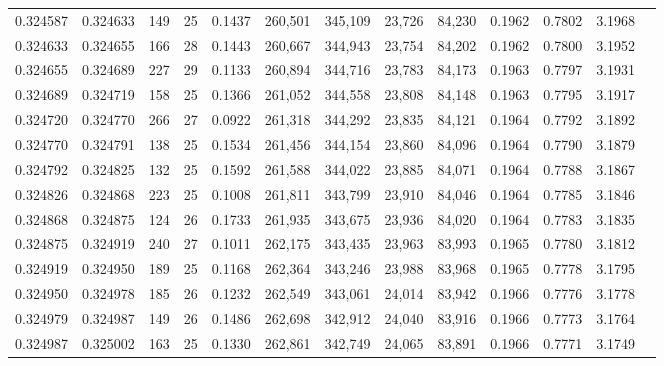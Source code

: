 \begin{tabular}{rrrrrrrrrrrrr}
0.324587 & 0.324633 &   149 &  25 &                                     0.1437 & 260,501 & 345,109 &  23,726 &  84,230 & 0.1962 & 0.7802 & 3.1968 \\
0.324633 & 0.324655 &   166 &  28 &                                     0.1443 & 260,667 & 344,943 &  23,754 &  84,202 & 0.1962 & 0.7800 & 3.1952 \\
0.324655 & 0.324689 &   227 &  29 &                                     0.1133 & 260,894 & 344,716 &  23,783 &  84,173 & 0.1963 & 0.7797 & 3.1931 \\
0.324689 & 0.324719 &   158 &  25 &                                     0.1366 & 261,052 & 344,558 &  23,808 &  84,148 & 0.1963 & 0.7795 & 3.1917 \\
0.324720 & 0.324770 &   266 &  27 &                                     0.0922 & 261,318 & 344,292 &  23,835 &  84,121 & 0.1964 & 0.7792 & 3.1892 \\
0.324770 & 0.324791 &   138 &  25 &                                     0.1534 & 261,456 & 344,154 &  23,860 &  84,096 & 0.1964 & 0.7790 & 3.1879 \\
0.324792 & 0.324825 &   132 &  25 &                                     0.1592 & 261,588 & 344,022 &  23,885 &  84,071 & 0.1964 & 0.7788 & 3.1867 \\
0.324826 & 0.324868 &   223 &  25 &                                     0.1008 & 261,811 & 343,799 &  23,910 &  84,046 & 0.1964 & 0.7785 & 3.1846 \\
0.324868 & 0.324875 &   124 &  26 &                                     0.1733 & 261,935 & 343,675 &  23,936 &  84,020 & 0.1964 & 0.7783 & 3.1835 \\
0.324875 & 0.324919 &   240 &  27 &                                     0.1011 & 262,175 & 343,435 &  23,963 &  83,993 & 0.1965 & 0.7780 & 3.1812 \\
0.324919 & 0.324950 &   189 &  25 &                                     0.1168 & 262,364 & 343,246 &  23,988 &  83,968 & 0.1965 & 0.7778 & 3.1795 \\
0.324950 & 0.324978 &   185 &  26 &                                     0.1232 & 262,549 & 343,061 &  24,014 &  83,942 & 0.1966 & 0.7776 & 3.1778 \\
0.324979 & 0.324987 &   149 &  26 &                                     0.1486 & 262,698 & 342,912 &  24,040 &  83,916 & 0.1966 & 0.7773 & 3.1764 \\
0.324987 & 0.325002 &   163 &  25 &                                     0.1330 & 262,861 & 342,749 &  24,065 &  83,891 & 0.1966 & 0.7771 & 3.1749 \\

\end{tabular}

